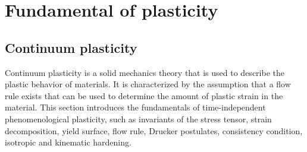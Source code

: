 \chapter{Fundamental of plasticity}

\section{Continuum plasticity}
Continuum plasticity is a solid mechanics theory that is used to describe the plastic behavior of materials.
It is characterized by the assumption that a flow rule exists that can be used to determine the amount of plastic strain in the material.
This section introduces the fundamentals of time-independent phenomenological plasticity, such as invariants of the stress tensor, strain decomposition, yield surface, flow rule, Drucker postulates, consistency condition, isotropic and kinematic hardening.

